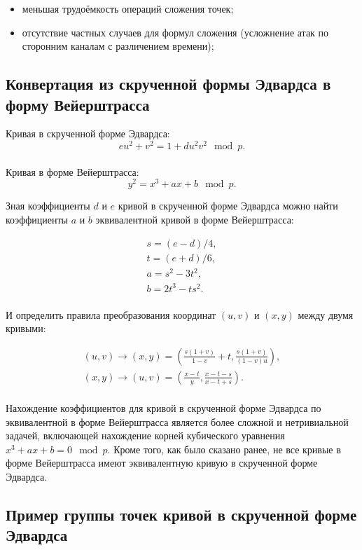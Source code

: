 \begin{itemize}
	\item меньшая трудоёмкость операций сложения точек;
	\item отсутствие частных случаев для формул сложения (усложнение атак по сторонним каналам с различением времени);
\end{itemize}

\subsection{Конвертация из скрученной формы Эдвардса в форму Вейерштрасса}

Кривая в скрученной форме Эдвардса:
\[eu^2+v^2=1+du^2v^2 \mod p.\]\\

Кривая в форме Вейерштрасса:\\
\[ y^{2} = x^{3} + ax + b \mod p.\]

Зная коэффициенты $d$ и $e$ кривой в скрученной форме Эдвардса можно найти коэффициенты $a$ и $b$ эквивалентной кривой в форме Вейерштрасса:

\[ \begin{array}{l}
	s = (e - d)/4, \\
    t = (e + d)/6, \\
	a = s^2 - 3t^2, \\
	b = 2t^3 - ts^2. \\
\end{array} \]

И определить правила преобразования координат $(u, v)$ и $(x, y)$ между двумя кривыми:

\[ \begin{array}{l}
(u,v) \longrightarrow(x, y)= (\frac{s(1+v)}{1-v}+t,\frac{s(1+v)}{(1-v)u}), \\
(x,y) \longrightarrow(u, v)= (\frac{x-t}{y}, \frac{x-t-s}{x-t+s}). \\
\end{array} \]

Нахождение коэффициентов для кривой в скрученной форме Эдвардса по эквивалентной в форме Вейерштрасса является более сложной и нетривиальной задачей, включающей нахождение корней кубического уравнения $x^{3} + ax + b = 0 \mod p$. Кроме того, как было сказано ранее, не все кривые в форме Вейерштрасса имеют эквивалентную кривую в скрученной форме Эдвардса.

\subsection{Пример группы точек кривой в скрученной форме Эдвардса}

